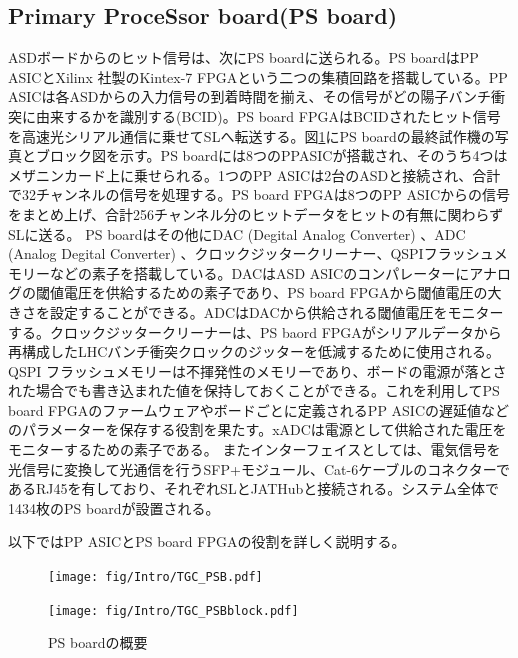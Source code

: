         \subsection*{Primary ProceSsor board(PS board)}
    ASDボードからのヒット信号は、次にPS boardに送られる。PS boardはPP ASICとXilinx 社製のKintex-7 FPGAという二つの集積回路を搭載している。PP ASICは各ASDからの入力信号の到着時間を揃え、その信号がどの陽子バンチ衝突に由来するかを識別する(BCID)。PS board FPGAはBCIDされたヒット信号を高速光シリアル通信に乗せてSLへ転送する。図\ref{TGC_PSB}にPS boardの最終試作機の写真とブロック図を示す。PS boardには8つのPPASICが搭載され、そのうち4つはメザニンカード上に乗せられる。1つのPP ASICは2台のASDと接続され、合計で32チャンネルの信号を処理する。PS board FPGAは8つのPP ASICからの信号をまとめ上げ、合計256チャンネル分のヒットデータをヒットの有無に関わらずSLに送る。
    PS boardはその他にDAC (Degital Analog Converter) 、ADC (Analog Degital Converter) 、クロックジッタークリーナー、QSPIフラッシュメモリーなどの素子を搭載している。DACはASD ASICのコンパレーターにアナログの閾値電圧を供給するための素子であり、PS board FPGAから閾値電圧の大きさを設定することができる。ADCはDACから供給される閾値電圧をモニターする。クロックジッタークリーナーは、PS baord FPGAがシリアルデータから再構成したLHCバンチ衝突クロックのジッターを低減するために使用される。QSPI フラッシュメモリーは不揮発性のメモリーであり、ボードの電源が落とされた場合でも書き込まれた値を保持しておくことができる。これを利用してPS board FPGAのファームウェアやボードごとに定義されるPP ASICの遅延値などのパラメーターを保存する役割を果たす。xADCは電源として供給された電圧をモニターするための素子である。
    またインターフェイスとしては、電気信号を光信号に変換して光通信を行うSFP+モジュール、Cat-6ケーブルのコネクターであるRJ45を有しており、それぞれSLとJATHubと接続される。システム全体で1434枚のPS boardが設置される。

    以下ではPP ASICとPS board FPGAの役割を詳しく説明する。

    \begin{figure}
    \begin{minipage}[b]{.5\linewidth}
    \centering
    \texttt{[image: fig/Intro/TGC\_PSB.pdf]}
    \end{minipage}%
    \begin{minipage}[b]{.5\linewidth}
    \centering
    \texttt{[image: fig/Intro/TGC\_PSBblock.pdf]}
    \end{minipage}%
    \caption[PS boardの概要]{PS boardの概要}
    \label{TGC_PSB}
    \end{figure}

